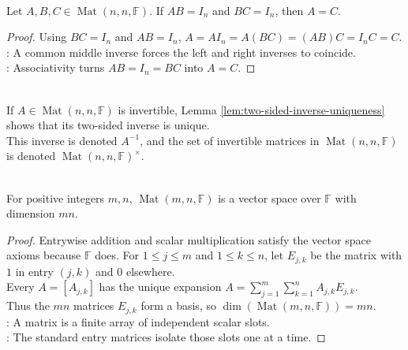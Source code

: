\begin{lemma} \label{lem:two-sided-inverse-uniqueness} \\
Let $A,B,C\in\operatorname{Mat}(n,n,\mathbb{F})$. If $AB=I_n$ and $BC=I_n$, then $A=C$.
\begin{proof}
Using $BC=I_n$ and $AB=I_n$, $A=AI_n=A(BC)=(AB)C=I_nC=C$.\\
: A common middle inverse forces the left and right inverses to coincide.\\
: Associativity turns $AB=I_n=BC$ into $A=C$.
\end{proof}
\end{lemma}

\begin{definition} \\
If $A\in\operatorname{Mat}(n,n,\mathbb{F})$ is invertible, Lemma \ref{lem:two-sided-inverse-uniqueness} shows that its two-sided inverse is unique.\\
This inverse is denoted $A^{-1}$, and the set of invertible matrices in $\operatorname{Mat}(n,n,\mathbb{F})$ is denoted $\operatorname{Mat}(n,n,\mathbb{F})^{\times}$.
\end{definition}

\begin{proposition} \label{prop:matrix-spaces-are-vector-spaces} \\
For positive integers $m,n$, $\operatorname{Mat}(m,n,\mathbb{F})$ is a vector space over $\mathbb{F}$ with dimension $mn$.
\begin{proof}
Entrywise addition and scalar multiplication satisfy the vector space axioms because $\mathbb{F}$ does. For $1\leq j\leq m$ and $1\leq k\leq n$, let $E_{j,k}$ be the matrix with $1$ in entry $(j,k)$ and $0$ elsewhere.\\
Every $A=[A_{j,k}]$ has the unique expansion $A=\sum_{j=1}^m\sum\limits_{k=1}^n A_{j,k}E_{j,k}$.\\
Thus the $mn$ matrices $E_{j,k}$ form a basis, so $\dim(\operatorname{Mat}(m,n,\mathbb{F}))=mn$.\\
: A matrix is a finite array of independent scalar slots.\\
: The standard entry matrices isolate those slots one at a time.
\end{proof}
\end{proposition}

